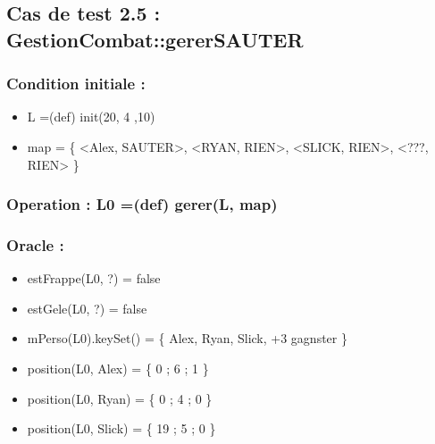\documentclass[11pt]{article}
\begin{document}
\subsection{Cas de test 2.5 : GestionCombat::gererSAUTER}
\label{sec-1.6}

\subsubsection{Condition initiale :}
\label{sec-1.6.1}

\begin{itemize}

\item L =(def) init(20, 4 ,10)\\
\label{sec-1.6.1.1}


\item map = \{ <Alex, SAUTER>, <RYAN, RIEN>, <SLICK, RIEN>, <???, RIEN> \}\\
\label{sec-1.6.1.2}

\end{itemize} %
\subsubsection{Operation : L0 =(def) gerer(L, map)}
\label{sec-1.6.2}

\subsubsection{Oracle :}
\label{sec-1.6.3}

\begin{itemize}

\item estFrappe(L0, ?) = false\\
\label{sec-1.6.3.1}


\item estGele(L0, ?) = false\\
\label{sec-1.6.3.2}


\item mPerso(L0).keySet() = \{ Alex, Ryan, Slick, +3 gagnster \}\\
\label{sec-1.6.3.3}


\item position(L0, Alex) = \{ 0 ; 6 ; 1 \}\\
\label{sec-1.6.3.4}


\item position(L0, Ryan) = \{ 0 ; 4 ; 0 \}\\
\label{sec-1.6.3.5}


\item position(L0, Slick) = \{ 19 ; 5 ; 0 \}\\
\label{sec-1.6.3.6}


\end{itemize} %
\end{document}
